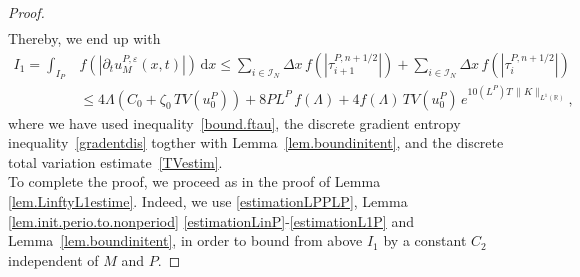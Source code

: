 \documentclass[10pt,a4paper]{amsart}
\newcommand{\I}{\mathcal{I}_N}
\newcommand{\R}{\mathbb{R}}
\newcommand{\dd}{\mathrm{d}}
\newcommand{\eps}{\varepsilon}
\newcommand{\pa}{\partial}
\begin{document}
\begin{proof}
\begin{align}
\end{align}
Thereby, we end up with
\begin{align*}
  I_1=  \int_{I_P} &f\left(\left|\pa_t u^{P,\eps}_M(x,t)\right|\right) \, \dd x \leq \sum_{i\in\I} \Delta x \, f\left(\left|\tau_{i + 1}^{P, n + 1/2}\right|\right) + \sum_{i\in\I} \Delta x\,  f\left(\left|\tau_{i } ^{P, n +1/2}\right|\right)\\
    &\leq 4\Lambda \left(C_0 + \zeta_0 \,TV(u^P_0)\right) + 8 PL^P \, f(\Lambda) + 4f(\Lambda) \, TV(u^P_0) \, e^{10 (L^P)T \, \|K\|_{L^1(\R)}},
\end{align*}
where we have used inequality~\eqref{bound.ftau}, the discrete gradient entropy inequality~\eqref{gradentdis} togther with Lemma~\ref{lem.boundinitent}, and the discrete total variation estimate~\eqref{TVestim}.\\
To complete the proof, we proceed as in the proof of Lemma \ref{lem.LinftyL1estime}. Indeed, we use \eqref{estimationLPPLP}, Lemma \ref{lem.init.perio.to.nonperiod} \eqref{estimationLinP}-\eqref{estimationL1P} and Lemma~\ref{lem.boundinitent},  in order to bound from above $I_1$ by a constant  $C_2$  independent of $M$ and $P$. 
\end{proof}
\end{document}
